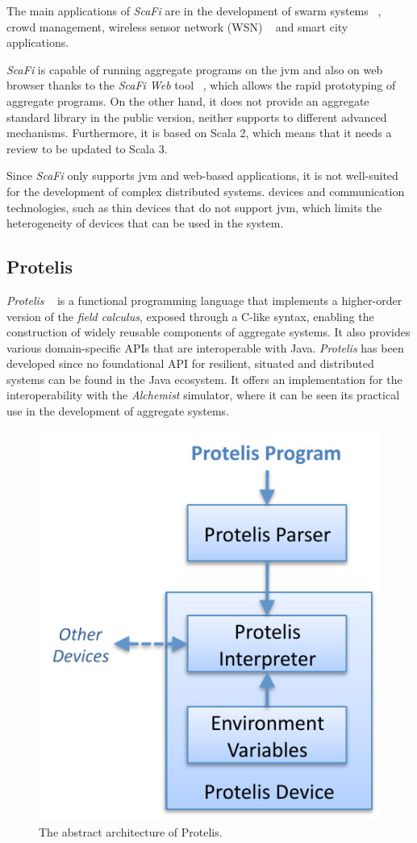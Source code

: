 The main applications of \emph{ScaFi} are in the development of swarm systems ~\cite{10336236}, crowd management, wireless sensor network (WSN) ~\cite{9935036}
and smart city applications.

\emph{ScaFi} is capable of running aggregate programs on the \ac{jvm} and also on web browser thanks
to the \emph{ScaFi Web} tool ~\cite{10.1007/978-3-030-78142-2_18}, which allows the rapid prototyping of aggregate programs.
On the other hand, it does not provide an aggregate standard library in the public version, neither supports to
different advanced mechanisms.
Furthermore, it is based on Scala 2, which means that it needs a review to be updated to Scala 3.

Since \emph{ScaFi} only supports \ac{jvm} and web-based applications, it is not well-suited for the development of complex distributed systems.
devices and communication technologies, such as thin devices that do not support \ac{jvm}, which limits the heterogeneity of
devices that can be used in the system.

\subsection{Protelis}
\label{subsec:protelis}
\emph{Protelis} ~\cite{protelis} is a functional programming language that implements a higher-order version of the \emph{field calculus},
exposed through a C-like syntax, enabling the construction of widely reusable components of aggregate systems.
It also provides various domain-specific APIs that are interoperable with Java.
\emph{Protelis} has been developed since no foundational API for resilient, situated and distributed systems can be found
in the Java ecosystem.
It offers an implementation for the interoperability with the \emph{Alchemist} simulator, where it can be seen its
practical use in the development of aggregate systems.

\begin{figure}
    \centering
    \includegraphics[width=.5\linewidth]{figures/protelis-structure}
    \caption{The abstract architecture of Protelis.}
    \label{fig:protelis-structure}
\end{figure}

